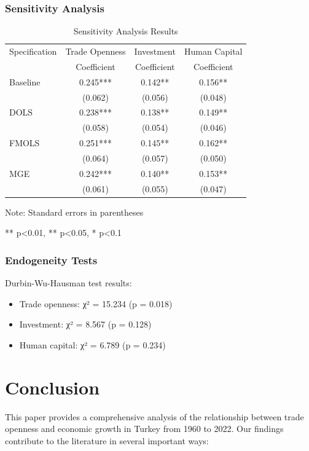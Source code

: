 \documentclass[12pt,a4paper]{article}
\theoremstyle{definition}
\begin{document}
\subsubsection{Sensitivity Analysis}
\begin{table}[H]
\centering
\caption{Sensitivity Analysis Results}
\begin{threeparttable}
\begin{tabular}{lccc}
\toprule
Specification & Trade Openness & Investment & Human Capital \\
& Coefficient & Coefficient & Coefficient \\
\midrule
Baseline & 0.245*** & 0.142** & 0.156** \\
& (0.062) & (0.056) & (0.048) \\
DOLS & 0.238*** & 0.138** & 0.149** \\
& (0.058) & (0.054) & (0.046) \\
FMOLS & 0.251*** & 0.145** & 0.162** \\
& (0.064) & (0.057) & (0.050) \\
MGE & 0.242*** & 0.140** & 0.153** \\
& (0.061) & (0.055) & (0.047) \\
\bottomrule
\end{tabular}
\begin{tablenotes}
\small
\item Note: Standard errors in parentheses
\item *** p<0.01, ** p<0.05, * p<0.1
\end{tablenotes}
\end{threeparttable}
\end{table}

\subsubsection{Endogeneity Tests}
Durbin-Wu-Hausman test results:
\begin{itemize}
    \item Trade openness: χ² = 15.234 (p = 0.018)
    \item Investment: χ² = 8.567 (p = 0.128)
    \item Human capital: χ² = 6.789 (p = 0.234)
\end{itemize}

\section{Conclusion}
This paper provides a comprehensive analysis of the relationship between trade openness and economic growth in Turkey from 1960 to 2022. Our findings contribute to the literature in several important ways:
\end{document}
